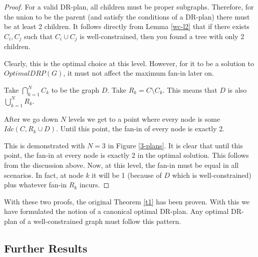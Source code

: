 \documentclass[11pt]{article}
\begin{document}
\begin{proof}
For a valid DR-plan, all children must be proper subgraphs. Therefore, for the union to be the parent (and satisfy the conditions of a DR-plan) there must be at least 2 children. It follows directly from Lemma \ref{wc-l2} that if there exists $C_i, C_j$ such that $C_i \cup C_j$ is well-constrained, then you found a tree with only 2 children.

Clearly, this is the optimal choice at this level. However, for it to be a solution to $OptimalDRP(G)$, it must not affect the maximum fan-in later on.

Take $\bigcap_{k=1}^N{C_k}$ to be the graph $D$. Take $R_k=C\setminus C_k$. This means that $D$ is also $\bigcup_{k=1}^N{R_k}$.

After we go down $N$ levels we get to a point where every node is some $Idc(C,R_k\cup D)$. Until this point, the fan-in of every node is exactly 2.

This is demonstrated with $N=3$ in Figure \ref{3-plans}. It is clear that until this point, the fan-in at every node is exactly 2 in the optimal solution. This follows from the discussion above. Now, at this level, the fan-in must be equal in all scenarios. In fact, at node $k$ it will be 1 (because of $D$ which is well-constrained) plus whatever fan-in $R_k$ incurs.
\end{proof}

With these two proofs, the original Theorem \ref{t1} has been proven. With this we have formulated the notion of a canonical optimal DR-plan. Any optimal DR-plan of a well-constrained graph must follow this pattern.






\subsection{Further Results}
\end{document}
